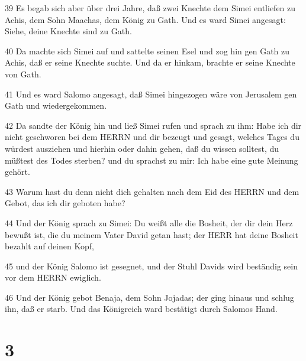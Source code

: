 \par 39 Es begab sich aber über drei Jahre, daß zwei Knechte dem Simei entliefen zu Achis, dem Sohn Maachas, dem König zu Gath. Und es ward Simei angesagt: Siehe, deine Knechte sind zu Gath.
\par 40 Da machte sich Simei auf und sattelte seinen Esel und zog hin gen Gath zu Achis, daß er seine Knechte suchte. Und da er hinkam, brachte er seine Knechte von Gath.
\par 41 Und es ward Salomo angesagt, daß Simei hingezogen wäre von Jerusalem gen Gath und wiedergekommen.
\par 42 Da sandte der König hin und ließ Simei rufen und sprach zu ihm: Habe ich dir nicht geschworen bei dem HERRN und dir bezeugt und gesagt, welches Tages du würdest ausziehen und hierhin oder dahin gehen, daß du wissen solltest, du müßtest des Todes sterben? und du sprachst zu mir: Ich habe eine gute Meinung gehört.
\par 43 Warum hast du denn nicht dich gehalten nach dem Eid des HERRN und dem Gebot, das ich dir geboten habe?
\par 44 Und der König sprach zu Simei: Du weißt alle die Bosheit, der dir dein Herz bewußt ist, die du meinem Vater David getan hast; der HERR hat deine Bosheit bezahlt auf deinen Kopf,
\par 45 und der König Salomo ist gesegnet, und der Stuhl Davids wird beständig sein vor dem HERRN ewiglich.
\par 46 Und der König gebot Benaja, dem Sohn Jojadas; der ging hinaus und schlug ihn, daß er starb. Und das Königreich ward bestätigt durch Salomos Hand.

\chapter{3}

